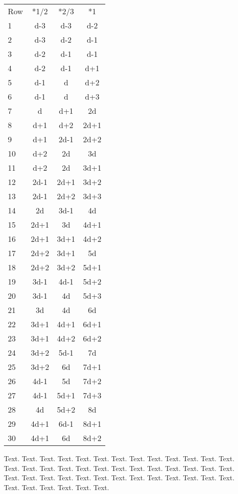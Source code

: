 \documentclass{article}
\begin{document}
\begin{multicols}{2}  %
\begin{tabular}{l | c | c | c}
Row& *1/2 & *2/3 & *1    \\
1  & d-3  & d-3  & d-2   \\
2  & d-3  & d-2  & d-1   \\
3  & d-2  & d-1  & d-1   \\
4  & d-2  & d-1  & d+1   \\
5  & d-1  & d    & d+2   \\
6  & d-1  & d    & d+3   \\
7  & d    & d+1  & 2d    \\
8  & d+1  & d+2  & 2d+1  \\
9  & d+1  & 2d-1 & 2d+2  \\
10 & d+2  & 2d   & 3d    \\
11 & d+2  & 2d   & 3d+1  \\
12 & 2d-1 & 2d+1 & 3d+2  \\
13 & 2d-1 & 2d+2 & 3d+3  \\
14 & 2d   & 3d-1 & 4d    \\
15 & 2d+1 & 3d   & 4d+1  \\
16 & 2d+1 & 3d+1 & 4d+2  \\
17 & 2d+2 & 3d+1 & 5d    \\
18 & 2d+2 & 3d+2 & 5d+1  \\
19 & 3d-1 & 4d-1 & 5d+2  \\
20 & 3d-1 & 4d   & 5d+3  \\
21 & 3d   & 4d   & 6d    \\
22 & 3d+1 & 4d+1 & 6d+1  \\
23 & 3d+1 & 4d+2 & 6d+2  \\
24 & 3d+2 & 5d-1 & 7d    \\
25 & 3d+2 & 6d   & 7d+1  \\
26 & 4d-1 & 5d   & 7d+2  \\
27 & 4d-1 & 5d+1 & 7d+3  \\
28 & 4d   & 5d+2 & 8d    \\
29 & 4d+1 & 6d-1 & 8d+1  \\
30 & 4d+1 & 6d   & 8d+2
\end{tabular}
Text. Text. Text. Text. Text. Text. Text. Text. Text. Text. Text. Text. Text. Text. Text.
Text. Text. Text. Text. Text. Text. Text. Text. Text. Text. Text. Text. Text. Text. Text.
Text. Text. Text. Text. Text. Text. Text. Text. Text. Text. Text. Text. Text. Text. Text.

\end{multicols}
\end{document}
